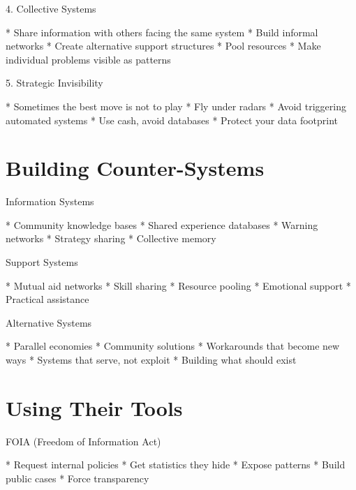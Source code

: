 \documentclass[12pt,oneside]{book}
\begin{document}
                4. Collective Systems

                    * Share information with others facing the same system
                    * Build informal networks
                    * Create alternative support structures
                    * Pool resources
                    * Make individual problems visible as patterns

                5. Strategic Invisibility

                    * Sometimes the best move is not to play
                    * Fly under radars
                    * Avoid triggering automated systems
                    * Use cash, avoid databases
                    * Protect your data footprint

\section{Building Counter-Systems}

                Information Systems

                    * Community knowledge bases
                    * Shared experience databases
                    * Warning networks
                    * Strategy sharing
                    * Collective memory

                Support Systems

                    * Mutual aid networks
                    * Skill sharing
                    * Resource pooling
                    * Emotional support
                    * Practical assistance

                Alternative Systems

                    * Parallel economies
                    * Community solutions
                    * Workarounds that become new ways
                    * Systems that serve, not exploit
                    * Building what should exist

\section{Using Their Tools}

                FOIA (Freedom of Information Act)

                    * Request internal policies
                    * Get statistics they hide
                    * Expose patterns
                    * Build public cases
                    * Force transparency
\end{document}
